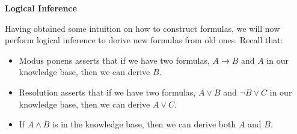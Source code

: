 \item {\bf Logical Inference}

Having obtained some intuition on how to construct formulas, we will now perform
logical inference to derive new formulas from old ones. Recall that:
\begin{itemize}
  \item Modus ponens asserts that if we have two formulas, $A \to B$ and $A$ in
  our knowledge base, then we can derive $B$.
  \item Resolution asserts that if we have two formulas, $A \vee B$ and $\neg B
  \vee C$ in our knowledge base, then we can derive $A \vee C$.
  \item If $A \wedge B$ is in the knowledge base, then we can derive both $A$
  and $B$.
\end{itemize}

\begin{enumerate}

  

  

\end{enumerate}
